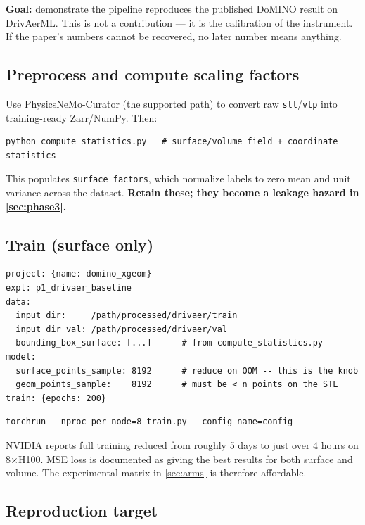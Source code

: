 \documentclass[10pt,a4paper]{article}
\theoremstyle{definition}
\begin{document}
\textbf{Goal:} demonstrate the pipeline reproduces the published DoMINO result on
DrivAerML. This is not a contribution --- it is the calibration of the instrument.
If the paper's numbers cannot be recovered, no later number means anything.

\subsection{Preprocess and compute scaling factors}

Use PhysicsNeMo-Curator (the supported path) to convert raw \texttt{stl}/\texttt{vtp}
into training-ready Zarr/NumPy. Then:

\begin{lstlisting}[style=sh]
python compute_statistics.py   # surface/volume field + coordinate statistics
\end{lstlisting}

This populates \texttt{surface\_factors}, which normalize labels to zero mean and
unit variance across the dataset. \textbf{Retain these; they become a leakage
hazard in \cref{sec:phase3}.}

\subsection{Train (surface only)}

\begin{lstlisting}[style=yml]
project: {name: domino_xgeom}
expt: p1_drivaer_baseline
data:
  input_dir:     /path/processed/drivaer/train
  input_dir_val: /path/processed/drivaer/val
  bounding_box_surface: [...]      # from compute_statistics.py
model:
  surface_points_sample: 8192      # reduce on OOM -- this is the knob
  geom_points_sample:    8192      # must be < n points on the STL
train: {epochs: 200}
\end{lstlisting}

\begin{lstlisting}[style=sh]
torchrun --nproc_per_node=8 train.py --config-name=config
\end{lstlisting}

NVIDIA reports full training reduced from roughly 5 days to just over 4 hours on
8$\times$H100. MSE loss is documented as giving the best results for both surface
and volume. The experimental matrix in \cref{sec:arms} is therefore affordable.

\subsection{Reproduction target}
\end{document}
